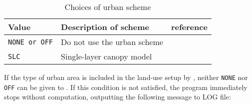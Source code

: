 \begin{table}[hbt]
\begin{center}
  \caption{Choices of urban scheme}
  \label{tab:nml_urban}
  \begin{tabularx}{150mm}{llX} \hline
    \rowcolor[gray]{0.9}  Value  & Description of scheme & reference \\ \hline
      \verb|NONE or OFF|  & Do not use the urban scheme            \\
      \verb|SLC|          & Single-layer canopy model  & \citet{kusaka_2001} \\
    \hline
  \end{tabularx}
\end{center}
\end{table}

If the type of urban area is included in the land-use setup by , neither \verb|NONE| nor \verb|OFF| can be given to . If this condition is not satisfied, the program immediately stops without computation, outputting the following message to LOG file:


